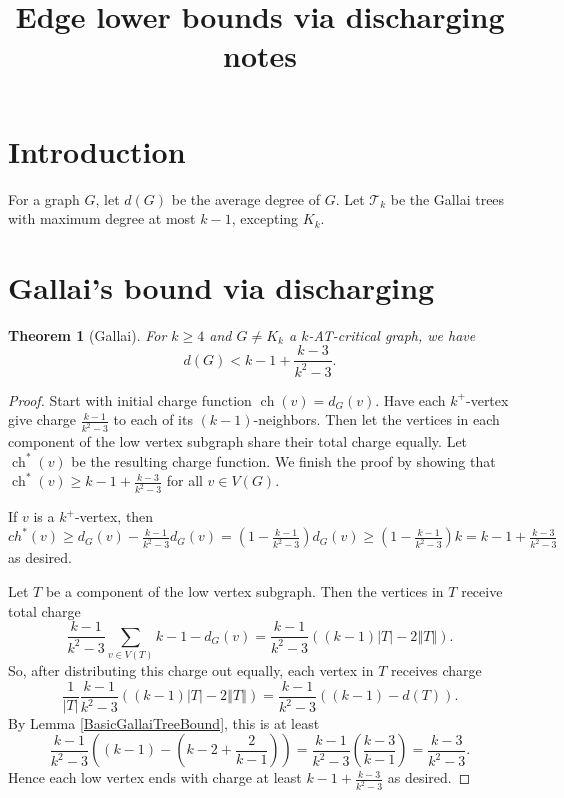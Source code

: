 \documentclass[12pt]{article}
\title{Edge lower bounds via discharging notes}
\theoremstyle{plain}
\newtheorem{thm}{Theorem}[section]
\theoremstyle{definition}
\theoremstyle{remark}
\newcommand{\fancy}[1]{\mathcal{#1}}
\newcommand{\T}{\fancy{T}}
\newcommand{\size}[1]{\left\Vert#1\right\Vert}
\newcommand{\parens}[1]{\left( #1 \right)}
\newcommand{\ch}{\operatorname{ch}}
\begin{document}
\maketitle

\section{Introduction}
For a graph $G$, let $d(G)$ be the average degree of $G$. Let $\T_k$ be the Gallai trees with maximum degree at most $k-1$, excepting $K_k$. 

\section{Gallai's bound via discharging}

\begin{thm}[Gallai]
	For $k \ge 4$ and $G \ne K_k$ a $k$-AT-critical graph, we have
	\[d(G) < k-1 + \frac{k-3}{k^2-3}.\]
\end{thm}
\begin{proof}
	Start with initial charge function $\ch(v) = d_G(v)$.  Have each $k^+$-vertex give charge $\frac{k-1}{k^2-3}$ to each of its $(k-1)$-neighbors.  Then let the vertices in each component of the low vertex subgraph share their total charge equally.  Let $\ch^*(v)$ be the resulting charge function.  We finish the proof by showing that $\ch^*(v) \ge k-1 + \frac{k-3}{k^2-3}$ for all $v \in V(G)$.
	
	If $v$ is a $k^+$-vertex, then $ch^*(v) \ge d_G(v) - \frac{k-1}{k^2-3}d_G(v) = \parens{1- \frac{k-1}{k^2-3}}d_G(v) \ge \parens{1- \frac{k-1}{k^2-3}}k = k-1 + \frac{k-3}{k^2-3}$ as desired.

	Let $T$ be a component of the low vertex subgraph.  Then the vertices in $T$ receive total charge
	\[\frac{k-1}{k^2-3}\sum_{v \in V(T)} k-1 - d_G(v) = \frac{k-1}{k^2-3}\parens{(k-1)|T| - 2\size{T}}.\]
	So, after distributing this charge out equally, each vertex in $T$ receives charge
	\[\frac{1}{|T|}\frac{k-1}{k^2-3}((k-1)|T| - 2\size{T}) = \frac{k-1}{k^2-3}\parens{(k-1) - d(T)}.\]
	By Lemma \ref{BasicGallaiTreeBound}, this is at least
	\[\frac{k-1}{k^2-3}\parens{(k-1) - \parens{k-2 + \frac{2}{k-1}}} = \frac{k-1}{k^2-3}\parens{\frac{k-3}{k-1}} = \frac{k-3}{k^2-3}.\]
	Hence each low vertex ends with charge at least $k-1 + \frac{k-3}{k^2-3}$ as desired.
\end{proof}
\end{document}
